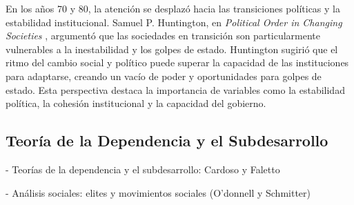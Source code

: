 \documentclass{article}
\begin{document}
En los años 70 y 80, la atención se desplazó hacia las transiciones políticas y la 
estabilidad institucional. Samuel P. Huntington, en \textit{Political Order in 
Changing Societies} \cite{huntington68political}, argumentó que las sociedades en 
transición son particularmente vulnerables a la inestabilidad y los golpes de 
estado. Huntington sugirió que el ritmo del cambio social y político puede superar 
la capacidad de las instituciones para adaptarse, creando un vacío de poder y 
oportunidades para golpes de estado. Esta perspectiva destaca la importancia de 
variables como la estabilidad política, la cohesión institucional y la capacidad del 
gobierno.


\subsection{Teoría de la Dependencia y el Subdesarrollo}

- Teorías de la dependencia y el subdesarrollo: Cardoso y Faletto




- Análisis sociales: elites y movimientos sociales (O'donnell y Schmitter)

\end{document}
